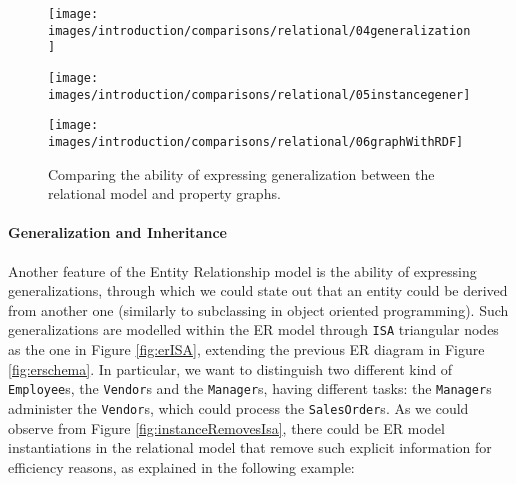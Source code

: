 \begin{figure}[!pth]
	\begin{minipage}[b]{\textwidth}
		\texttt{[image: images/introduction/comparisons/relational/04generalization]}
		\label{fig:erISA}
	\end{minipage}\quad
	
	\begin{minipage}[b]{\textwidth}
		\texttt{[image: images/introduction/comparisons/relational/05instancegener]}
		\label{fig:instanceRemovesIsa}
	\end{minipage}
	
	\begin{minipage}[b]{\textwidth}
		\centering
		\texttt{[image: images/introduction/comparisons/relational/06graphWithRDF]}
		\label{fig:graphofISAInstance}
	\end{minipage}
	\caption{Comparing the ability of expressing generalization between the relational model and property graphs. }
	\label{fig:relationalinstance}
\end{figure}

\paragraph*{Generalization and Inheritance}
Another feature of the Entity Relationship model is the ability of expressing generalizations, through which we could state out that an entity could be derived from another one (similarly to subclassing in object oriented programming). Such generalizations are modelled within the ER model through \texttt{ISA} triangular nodes as the one in Figure \vref{fig:erISA}, extending the previous ER diagram in Figure \ref{fig:erschema}. In particular, we want to distinguish two different kind of \texttt{Employee}s, the \texttt{Vendor}s and the \texttt{Manager}s, having different tasks: the \texttt{Manager}s administer the \texttt{Vendor}s, which could process the \texttt{SalesOrder}s. As we could observe from Figure \ref{fig:instanceRemovesIsa}, there could be ER model instantiations in the relational model that remove such explicit information for efficiency reasons, as explained in the following example:

